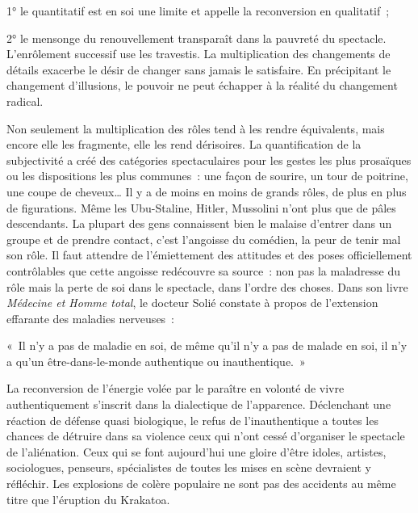 \documentclass[french,twoside]{book} %
\newcommand{\astermono}{\medskip\centerline{\color{rubric}\large\selectfont{\syms ✻}}\medskip\par}%
\newenvironment{quoteblock}%
  {\begin{quoting}}
  {\end{quoting}}
\newenvironment{quotebar}{%
    \def\FrameCommand{{\color{rubric!10!}\vrule width 0.5em} \hspace{0.9em}}%
    \def\OuterFrameSep{\itemsep} %
    \MakeFramed {\advance\hsize-\width \FrameRestore}
  }%
  {%
    \endMakeFramed
  }
\renewenvironment{quoteblock}%
  {%
    \savenotes
    \setstretch{0.9}
    \normalfont
    \begin{quotebar}
  }
  {%
    \end{quotebar}
    \spewnotes
  }
\begin{document}
1° le quantitatif est en soi une limite et appelle la reconversion en qualitatif ;\par
2° le mensonge du renouvellement transparaît dans la pauvreté du spectacle. L’enrôlement successif use les travestis. La multiplication des changements de détails exacerbe le désir de changer sans jamais le satisfaire. En précipitant le changement d’illusions, le pouvoir ne peut échapper à la réalité du changement radical.\par
Non seulement la multiplication des rôles tend à les rendre équivalents, mais encore elle les fragmente, elle les rend dérisoires. La quantification de la subjectivité a créé des catégories spectaculaires pour les gestes les plus prosaïques ou les dispositions les plus communes : une façon de sourire, un tour de poitrine, une coupe de cheveux… Il y a de moins en moins de grands rôles, de plus en plus de figurations. Même les Ubu-Staline, Hitler, Mussolini n’ont plus que de pâles descendants. La plupart des gens connaissent bien le malaise d’entrer dans un groupe et de prendre contact, c’est l’angoisse du comédien, la peur de tenir mal son rôle. Il faut attendre de l’émiettement des attitudes et des poses officiellement contrôlables que cette angoisse redécouvre sa source : non pas la maladresse du rôle mais la perte de soi dans le spectacle, dans l’ordre des choses. Dans son livre \emph{Médecine et Homme total}, le docteur Solié constate à propos de l’extension effarante des maladies nerveuses :\par

\begin{quoteblock}
\noindent « Il n’y a pas de maladie en soi, de même qu’il n’y a pas de malade en soi, il n’y a qu’un être-dans-le-monde authentique ou inauthentique. »\end{quoteblock}

\noindent La reconversion de l’énergie volée par le paraître en volonté de vivre authentiquement s’inscrit dans la dialectique de l’apparence. Déclenchant une réaction de défense quasi biologique, le refus de l’inauthentique a toutes les chances de détruire dans sa violence ceux qui n’ont cessé d’organiser le spectacle de l’aliénation. Ceux qui se font aujourd’hui une gloire d’être idoles, artistes, sociologues, penseurs, spécialistes de toutes les mises en scène devraient y réfléchir. Les explosions de colère populaire ne sont pas des accidents au même titre que l’éruption du Krakatoa.\par

\astermono
\end{document}
